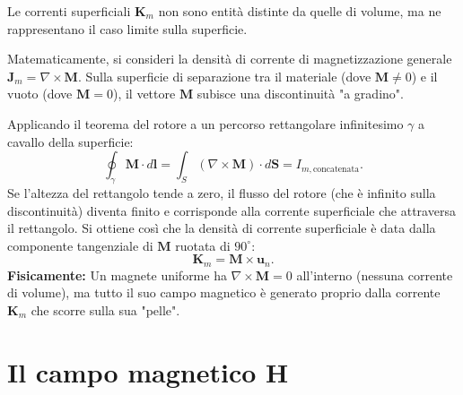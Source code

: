 \documentclass[a4paper,11pt]{report}
\begin{document}
\begin{approfondimento}[colback= white, colframe=green!35!black, no shadow, title={Derivazione formale di \texorpdfstring{$\bm{K}_m$}{Km}}]
    Le correnti superficiali $\bm{K}_m$ non sono entità distinte da quelle di volume, ma ne rappresentano il caso limite sulla superficie.
    
    Matematicamente, si consideri la densità di corrente di magnetizzazione generale $\bm{J}_m = \nabla \times \bm{M}$.
    Sulla superficie di separazione tra il materiale (dove $\bm{M} \neq 0$) e il vuoto (dove $\bm{M} = 0$), il vettore $\bm{M}$ subisce una discontinuità "a gradino".
    
    Applicando il teorema del rotore a un percorso rettangolare infinitesimo $\gamma$ a cavallo della superficie:
    \begin{equation}
        \oint_\gamma \bm{M} \cdot d\bm{l} = \int_S (\nabla \times \bm{M}) \cdot d\bm{S} = I_{m, \text{concatenata}}.
    \end{equation}
    Se l'altezza del rettangolo tende a zero, il flusso del rotore (che è infinito sulla discontinuità) diventa finito e corrisponde alla corrente superficiale che attraversa il rettangolo.
    Si ottiene così che la densità di corrente superficiale è data dalla componente tangenziale di $\bm{M}$ ruotata di $90^\circ$:
    \begin{equation}
        \bm{K}_m = \bm{M} \times \bm{u}_n.
    \end{equation}
    \textbf{Fisicamente:} Un magnete uniforme ha $\nabla \times \bm{M} = 0$ all'interno (nessuna corrente di volume), ma tutto il suo campo magnetico è generato proprio dalla corrente $\bm{K}_m$ che scorre sulla sua "pelle".
\end{approfondimento}


\section{Il campo magnetico \texorpdfstring{$\bm{H}$}{H}}
\end{document}
